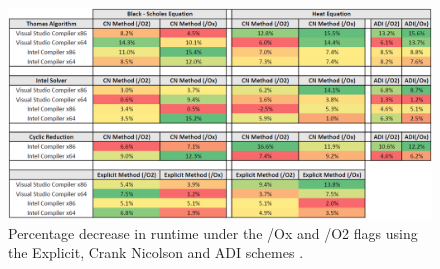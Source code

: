 \documentclass[12pt, oneside]{book}
\theoremstyle{plain}
\theoremstyle{definition}
\begin{document}
\begin{figure}[!htb]
    \centering
        \includegraphics[scale=0.5]{FlagPercent.png}
    \caption{Percentage decrease in runtime under the /Ox and /O2 flags using the Explicit, Crank Nicolson and ADI schemes .}
    \label{flagPercent}
\end{figure}




\end{document}
